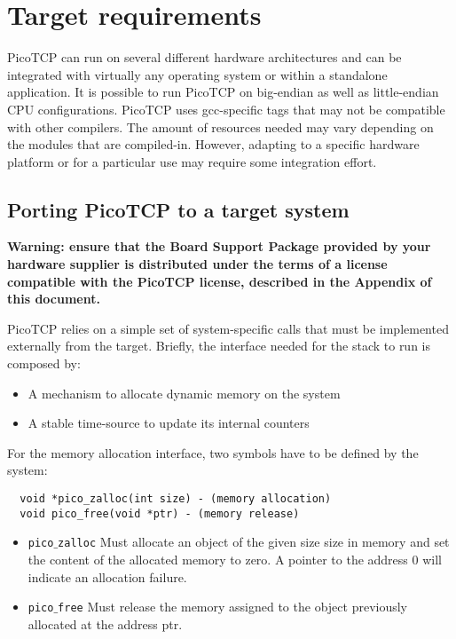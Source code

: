 \section{Target requirements}
PicoTCP can run on several different hardware architectures and can be
integrated with virtually any operating system or within a standalone
application. It is possible to run PicoTCP on big-endian as well as
little-endian CPU configurations. PicoTCP uses gcc-specific tags that may
not be compatible with other compilers. The amount of resources needed
may vary depending on the modules that are compiled-in. However, adapting
to a specific hardware platform or for a particular use may require some
integration effort.

\subsection{Porting PicoTCP to a target system}

\begin{center}
\textbf{Warning: ensure that the Board Support Package provided by your
hardware supplier is distributed under the terms of a license compatible
with the PicoTCP license, described in the Appendix of this document.}
\end{center}

PicoTCP relies on a simple set of system-specific calls that must be
implemented externally from the target. Briefly, the interface needed for
the stack to run is composed by:
\begin{itemize}
\item A mechanism to allocate dynamic memory on the system
\item A stable time-source to update its internal counters
\end{itemize} 

For the memory allocation interface, two symbols have to be defined by the system:
\begin{verbatim}
  void *pico_zalloc(int size) - (memory allocation) 
  void pico_free(void *ptr) - (memory release)
\end{verbatim}

\begin{itemize}
\item \texttt{pico$\_$zalloc} Must allocate an object of the given size size in memory
and set the content of the allocated memory to zero. A pointer to the address 0 will
indicate an allocation failure.
\item \texttt{pico$\_$free} Must release the memory assigned to the object previously
allocated at the address ptr.
\end{itemize}


